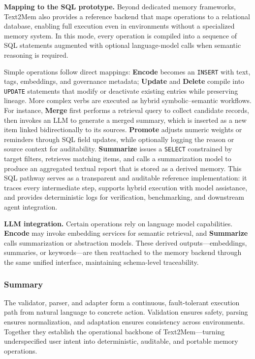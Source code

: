 \documentclass[conference]{IEEEtran}
\begin{document}
\textbf{Mapping to the SQL prototype.}  
Beyond dedicated memory frameworks, Text2Mem also provides a reference backend that maps operations to a relational database, enabling full execution even in environments without a specialized memory system.  
In this mode, every operation is compiled into a sequence of SQL statements augmented with optional language-model calls when semantic reasoning is required.  

Simple operations follow direct mappings: \textbf{Encode} becomes an \texttt{INSERT} with text, tags, embeddings, and governance metadata; \textbf{Update} and \textbf{Delete} compile into \texttt{UPDATE} statements that modify or deactivate existing entries while preserving lineage.  
More complex verbs are executed as hybrid symbolic–semantic workflows.  
For instance, \textbf{Merge} first performs a retrieval query to collect candidate records, then invokes an LLM to generate a merged summary, which is inserted as a new item linked bidirectionally to its sources.  
\textbf{Promote} adjusts numeric weights or reminders through SQL field updates, while optionally logging the reason or source context for auditability.  
\textbf{Summarize} issues a \texttt{SELECT} constrained by target filters, retrieves matching items, and calls a summarization model to produce an aggregated textual report that is stored as a derived memory.  
This SQL pathway serves as a transparent and auditable reference implementation: it traces every intermediate step, supports hybrid execution with model assistance, and provides deterministic logs for verification, benchmarking, and downstream agent integration.

\textbf{LLM integration.}  
Certain operations rely on language model capabilities.  
\textbf{Encode} may invoke embedding services for semantic retrieval, and \textbf{Summarize} calls summarization or abstraction models.  
These derived outputs—embeddings, summaries, or keywords—are then reattached to the memory backend through the same unified interface, maintaining schema-level traceability.

\subsubsection{\textbf{Summary}}
The validator, parser, and adapter form a continuous, fault-tolerant execution path from natural language to concrete action.  
Validation ensures safety, parsing ensures normalization, and adaptation ensures consistency across environments.  
Together they establish the operational backbone of Text2Mem—turning underspecified user intent into deterministic, auditable, and portable memory operations.
\end{document}
